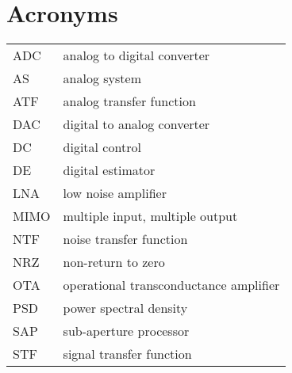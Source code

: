 \section*{Acronyms}
\begin{tabular}{ p{2cm} l }
    ADC        &  analog to digital converter \\
    AS         &  analog system \\
    ATF        &  analog transfer function \\
    DAC        &  digital to analog converter \\
    DC         &  digital control \\
    DE         &  digital estimator \\
    LNA        &  low noise amplifier \\
    MIMO       &  multiple input, multiple output \\
    NTF        &  noise transfer function \\
    NRZ        &  non-return to zero \\
    OTA        &  operational transconductance amplifier \\
    PSD        &  power spectral density \\
    SAP        &  sub-aperture processor \\
    STF        &  signal transfer function \\

\end{tabular}

